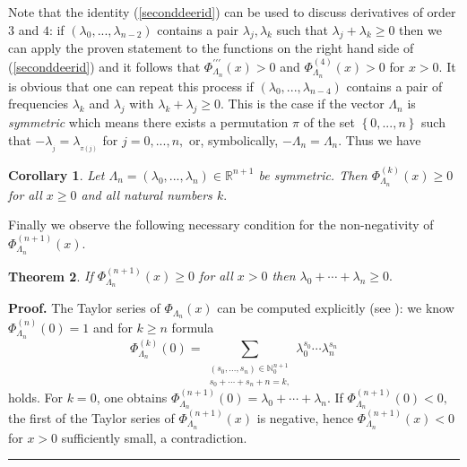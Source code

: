 \documentclass[11pt]{article}%
\newtheorem{theorem}{Theorem}
\newtheorem{corollary}[theorem]{Corollary}
\newenvironment{proof}[1][Proof]{\textbf{#1.} }{\ \rule{0.5em}{0.5em}}
\begin{document}
Note that the identity (\ref{seconddeerid}) can be used to discuss derivatives
of order $3$ and $4$: if $\left(  \lambda_{0},...,\lambda_{n-2}\right)  $
contains a pair $\lambda_{j},\lambda_{k}$ such that $\lambda_{j}+\lambda
_{k}\geq0$ then we can apply the proven statement to the functions on the
right hand side of (\ref{seconddeerid}) and it follows that $\Phi_{\Lambda
_{n}}^{\prime\prime\prime}\left(  x\right)  >0$ and $\Phi_{\Lambda_{n}%
}^{\left(  4\right)  }\left(  x\right)  >0$ for $x>0.$ It is obvious that one
can repeat this process if $\left(  \lambda_{0},...,\lambda_{n-4}\right)  $
contains a pair of frequencies $\lambda_{k}$ and $\lambda_{j}$ with
$\lambda_{k}+\lambda_{j}\geq0.$ This is the case if the vector $\Lambda_{n}$
is \emph{symmetric} which means there exists a permutation $\pi$ of the set
$\left\{  0,...,n\right\}  $ such that $-\lambda_{_{j}}=\lambda_{_{\pi(j)}}$
for $j=0,...,n,$ or, symbolically, $-\Lambda_{n}=\Lambda_{n}.$ Thus we have

\begin{corollary}
Let $\Lambda_{n}=\left(  \lambda_{0},...,\lambda_{n}\right)  \in
\mathbb{R}^{n+1}$ be symmetric. Then $\Phi_{\Lambda_{n}}^{\left(  k\right)
}\left(  x\right)  \geq0$ for all $x\geq0$ and all natural numbers $k.$
\end{corollary}

Finally we observe the following necessary condition for the non-negativity of
$\Phi_{\Lambda_{n}}^{\left(  n+1\right)  }\left(  x\right)  .$

\begin{theorem}
If $\Phi_{\Lambda_{n}}^{\left(  n+1\right)  }\left(  x\right)  \geq0$ for all
$x>0$ then $\lambda_{0}+\cdots+\lambda_{n}\geq0.$
\end{theorem}

\begin{proof}
The Taylor series of $\Phi_{\Lambda_{n}}\left(  x\right)  $ can be computed
explicitly (see \cite{KoRe13}): we know $\Phi_{\Lambda_{n}}^{\left(  n\right)
}\left(  0\right)  =1$ and for $k\geq n$ formula
\begin{equation}
\Phi_{\Lambda_{n}}^{\left(  k\right)  }\left(  0\right)  =\sum
_{\substack{\left(  s_{0},\ldots,s_{n}\right)  \in\mathbb{N}_{0}^{n+1}\text{
}\\s_{0}+\cdots+s_{n}+n=k,}}\lambda_{0}^{s_{0}}\cdots\lambda_{n}^{s_{n}}
\label{eqTaylorcoeffphi}%
\end{equation}
holds. For $k=0$, one obtains $\Phi_{\Lambda_{n}}^{\left(  n+1\right)
}\left(  0\right)  =\lambda_{0}+\cdots+\lambda_{n}.$ If $\Phi_{\Lambda_{n}%
}^{\left(  n+1\right)  }\left(  0\right)  <0,$ the first of the Taylor series
of $\Phi_{\Lambda_{n}}^{\left(  n+1\right)  }\left(  x\right)  $ is negative,
hence $\Phi_{\Lambda_{n}}^{\left(  n+1\right)  }\left(  x\right)  <0$ for
$x>0$ sufficiently small, a contradiction.
\end{proof}
\end{document}
